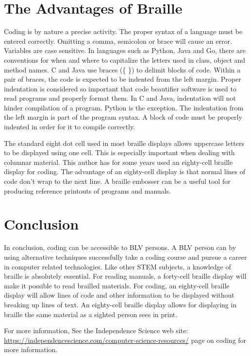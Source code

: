 \documentclass[11.5pt]{sig-alternate}
\begin{document}
\begin{large}
\section*{The Advantages of Braille}
Coding is by nature a precise activity. The proper syntax of a language must be entered correctly. Omitting a comma, semicolon or brace will cause an error. Variables are case sensitive. In languages such as Python, Java and Go, there are conventions for when and where to capitalize the letters used in class, object and method names. C and Java use braces (\{ \}) to delimit blocks of code. Within a pair of braces, the code is expected to be indented from the left margin. Proper indentation is considered so important that code beautifier software is used to read programs and properly format them. In C and Java, indentation will not hinder compilation of a program. Python is the exception. The indentation from the left margin is part of the program syntax. A block of code must be properly indented in order for it to compile correctly.

The standard eight dot cell used in most braille displays allows uppercase letters to be displayed using one cell. This is especially important when dealing with columnar material. This author has for some years used an eighty-cell braille display for coding. The advantage of an eighty-cell display is that normal lines of code don't wrap to the next line. A braille embosser can be a useful tool for producing reference printouts of programs and manuals.
\\
\section*{Conclusion}
In conclusion, coding can be accessible to BLV persons. A BLV person can by using alternative techniques successfully take a coding course and pursue a career in computer related technologies. Like other STEM subjects, a knowledge of braille is absolutely essential. For reading manuals, a forty-cell braille display will make it possible to read brailled materials. For coding, an eighty-cell braille display will allow lines of code and other information to be displayed without breaking up lines of text. An eighty-cell braille display allows for displaying in braille the same material as a sighted person sees in print.

For more information, See the Independence Science web site: \url{https://independencescience.com/computer-science-resources/} page on coding for more information.
\raggedbottom



\end{large}
\end{document}
